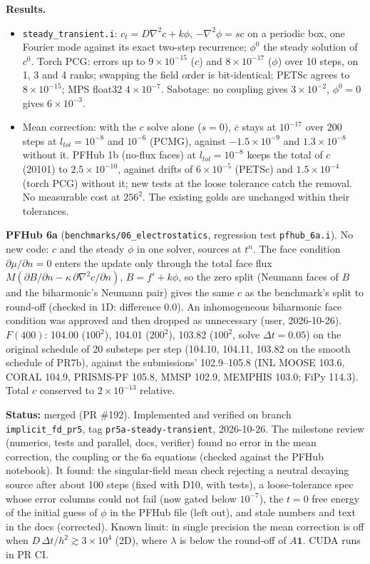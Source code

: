 \documentclass[11pt]{article}
\newcommand{\status}[1]{\textcolor{marlinteal}{\textbf{Status:}} #1}
\begin{document}
\textbf{Results.}
\begin{itemize}
\item \texttt{steady\_transient.i}: $c_t = D\nabla^2 c + k\phi$,
  $-\nabla^2\phi = s c$ on a periodic box, one Fourier mode against its exact
  two-step recurrence; $\phi^0$ the steady solution of $c^0$. Torch PCG: errors
  up to $9\times10^{-15}$ ($c$) and $8\times10^{-17}$ ($\phi$) over 10 steps, on 1, 3
  and 4 ranks; swapping the field order is bit-identical; PETSc agrees to
  $8\times10^{-15}$; MPS float32 $4\times10^{-7}$. Sabotage: no coupling gives
  $3\times10^{-2}$, $\phi^0 = 0$ gives $6\times10^{-3}$.
\item Mean correction: with the $c$ solve alone ($s = 0$), $\overline{c}$ stays
  at $10^{-17}$ over 200 steps at $l_{tol} = 10^{-8}$ and $10^{-6}$ (PCMG), against $-1.5\times10^{-9}$ and
  $1.3\times10^{-8}$ without it. PFHub 1b (no-flux faces) at
  $l_{tol} = 10^{-8}$ keeps the total of $c$ (20101) to $2.5\times10^{-10}$,
  against drifts of $6\times10^{-5}$ (PETSc) and $1.5\times10^{-4}$ (torch PCG)
  without it; new tests at the loose tolerance catch the removal. No
  measurable cost at $256^2$. The existing golds are unchanged within their
  tolerances.
\end{itemize}

\textbf{PFHub 6a} (\texttt{benchmarks/06\_electrostatics}, regression test
\texttt{pfhub\_6a.i}). No new code: $c$ and the steady $\phi$ in one solver,
sources at $t^n$. The face condition $\partial\mu/\partial n = 0$ enters the
update only through the total face flux
$M(\partial B/\partial n - \kappa\,\partial\nabla^2c/\partial n)$, $B = f' + k\phi$, so
the zero split (Neumann faces of $B$ and the biharmonic's Neumann pair) gives the
same $c$ as the benchmark's split to round-off (checked in 1D: difference 0.0).
An inhomogeneous biharmonic face condition was approved and then dropped as
unnecessary (user, 2026-10-26). $F(400)$: 104.00 ($100^2$), 104.01 ($200^2$),
103.82 ($100^2$, solve $\Delta t = 0.05$) on the original schedule of 20 substeps per step
(104.10, 104.11, 103.82 on the smooth schedule of PR7b), against the submissions'
102.9--105.8 (INL MOOSE 103.6, CORAL 104.9, PRISMS-PF 105.8, MMSP 102.9,
MEMPHIS 103.0; FiPy 114.3). Total $c$ conserved to $2\times10^{-13}$ relative.

\status{merged (PR \#192). Implemented and verified on branch \texttt{implicit\_fd\_pr5}, tag
\texttt{pr5a-steady-transient}, 2026-10-26. The milestone review (numerics, tests and
parallel, docs, verifier) found no error in the mean correction, the coupling or the 6a
equations (checked against the PFHub notebook). It found: the singular-field mean check
rejecting a neutral decaying source after about 100 steps (fixed with D10, with tests), a
loose-tolerance spec whose error columns could not fail (now gated below $10^{-7}$), the
$t = 0$ free energy of the initial guess of $\phi$ in the PFHub file (left out), and stale
numbers and text in the docs (corrected). Known limit: in single precision the mean correction
is off when $D\,\Delta t/h^2 \gtrsim 3\times10^4$ (2D), where $\lambda$ is below the round-off of
$A\mathbf{1}$. CUDA runs in PR CI.}
\end{document}
